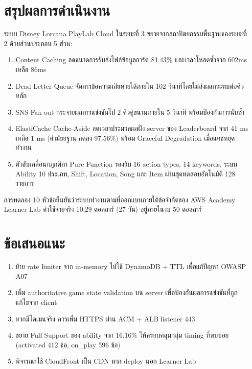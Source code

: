 \documentclass[12pt,a4paper]{report}
\begin{document}
\section{สรุปผลการดำเนินงาน}

ระบบ Disney Lorcana PlayLab Cloud ในระยะที่ 3 ขยายจากสถาปัตยกรรมพื้นฐานของระยะที่ 2 ด้วยส่วนประกอบ 5 ส่วน:

\begin{enumerate}
    \item Content Caching ลดขนาดการรับส่งไฟล์ข้อมูลการ์ด 81.43\% และเวลาโหลดซ้ำจาก 602ms เหลือ 86ms
    \item Dead Letter Queue จัดการข้อความเสียหายได้ภายใน 102 วินาทีโดยไม่ส่งผลกระทบต่อคิวหลัก
    \item SNS Fan-out กระจายผลการแข่งขันไป 2 คิวคู่ขนานภายใน 5 วินาที พร้อมป้องกันการนับซ้ำ
    \item ElastiCache Cache-Aside ลดเวลาประมวลผลฝั่ง server ของ Leaderboard จาก 41 ms เหลือ 1 ms (ค่ามัธยฐาน ลดลง 97.56\%) พร้อม Graceful Degradation เมื่อแคชหยุดทำงาน
    \item ตัวขับเคลื่อนกฎกติกา Pure Function รองรับ 16 action types, 14 keywords, ระบบ Ability 10 ประเภท, Shift, Location, Song และ Item ผ่านชุดทดสอบอัตโนมัติ 128 รายการ
\end{enumerate}

การทดลอง 10 หัวข้อยืนยันว่าระบบทำงานตามที่ออกแบบภายใต้ข้อจำกัดของ AWS Academy Learner Lab ค่าใช้จ่ายจริง 10.29 ดอลลาร์ (27 วัน) อยู่ภายในงบ 50 ดอลลาร์

\section{ข้อเสนอแนะ}

\begin{enumerate}
    \item ย้าย rate limiter จาก in-memory ไปใช้ DynamoDB + TTL เพื่อแก้ปัญหา OWASP A07
    \item เพิ่ม authoritative game state validation บน server เพื่อป้องกันผลการแข่งขันที่ถูกแก้ไขจาก client
    \item หากมีโดเมนจริง ควรเพิ่ม HTTPS ผ่าน ACM + ALB listener 443
    \item ขยาย Full Support ของ ability จาก 16.16\% ให้ครอบคลุมกลุ่ม timing ที่พบบ่อย (activated 412 ข้อ, on\_play 596 ข้อ)
    \item พิจารณาใช้ CloudFront เป็น CDN หาก deploy นอก Learner Lab
\end{enumerate}

\end{document}

